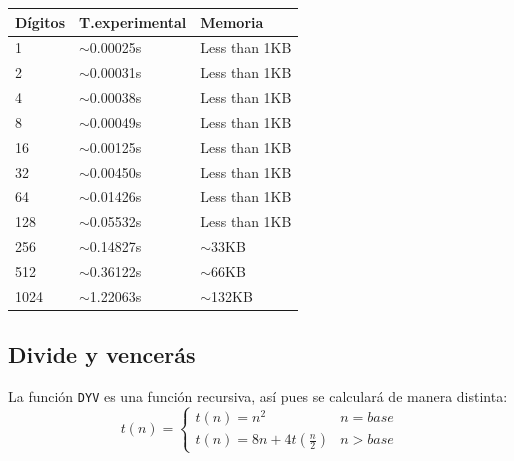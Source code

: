 \documentclass{article}
\begin{document}
\begin{adjustbox}{width=0.5\textwidth,center=\textwidth}
\begin{tabular}{|l|l|l|}
\hline
{Dígitos} 					   & {T.experimental} 					   & {Memoria} 						\\ \hline
1                              & $\sim$0.00025s                        & Less than 1KB                  \\ \hline
2                              & $\sim$0.00031s                        & Less than 1KB                  \\ \hline
4                              & $\sim$0.00038s                        & Less than 1KB                  \\ \hline
8                              & $\sim$0.00049s                        & Less than 1KB                  \\ \hline
16                             & $\sim$0.00125s                        & Less than 1KB                  \\ \hline
32                             & $\sim$0.00450s                        & Less than 1KB                  \\ \hline
64                             & $\sim$0.01426s                        & Less than 1KB                  \\ \hline
128                            & $\sim$0.05532s                        & Less than 1KB                  \\ \hline
256                            & $\sim$0.14827s                        & $\sim$33KB                     \\ \hline
512                            & $\sim$0.36122s                        & $\sim$66KB                     \\ \hline
1024                           & $\sim$1.22063s                        & $\sim$132KB                    \\ \hline
\end{tabular}
\end{adjustbox}

\newpage
\subsection{Divide y vencerás}
La función \texttt{DYV} es una función recursiva, así pues se calculará de manera distinta:
$$
	t(n) = \left\{
        \begin{array}{ll}
           	t(n)=n^2 & n=base \\
			t(n)=8n+4t(\frac{n}{2}) & n>base
        \end{array}
    \right.
$$
\end{document}
